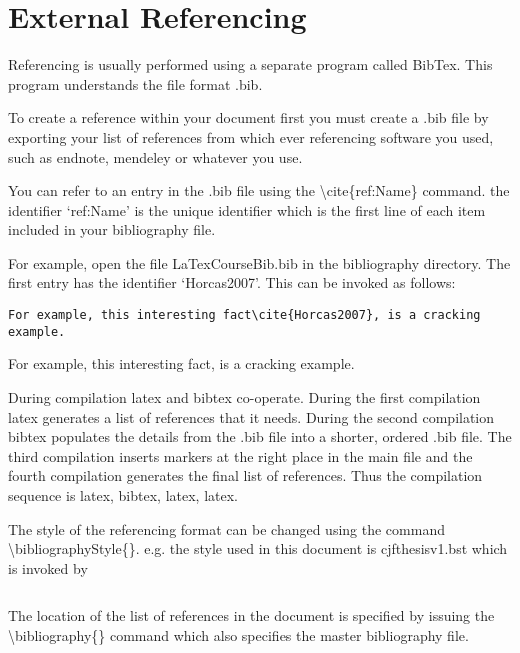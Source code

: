 \chapter{External Referencing}

Referencing is usually performed using a separate program called BibTex.  This program understands the file format .bib.

To create a reference within your document first you must create a .bib file by exporting your list of references from which ever referencing software you used, such as endnote, mendeley or whatever you use.

You can refer to an entry in the .bib file using the {\textbackslash}cite\{ref:Name\} command. the identifier `ref:Name' is the unique identifier which is the first line of each item included in your bibliography file.

For example, open the file LaTexCourseBib.bib in the bibliography directory. The first entry has the identifier `Horcas2007'.  This can be invoked as follows:


\begin{verbatim}
For example, this interesting fact\cite{Horcas2007}, is a cracking example.
\end{verbatim}

For example, this interesting fact\cite{Horcas2007}, is a cracking example.

During compilation latex and bibtex co-operate. During the first compilation latex generates a list of references that it needs.  During the second compilation bibtex populates the details from the .bib file into a shorter, ordered .bib file. The third compilation inserts markers at the right place in the main file and the fourth compilation generates the final list of references. Thus the compilation sequence is latex, bibtex, latex, latex.

The style of the referencing format can be changed using the command {\textbackslash}bibliographyStyle\{\}. e.g. the style used in this document is cjfthesisv1.bst which is invoked by 

\begin{verbatim}

\end{verbatim}

The location of the list of references in the document is specified by issuing the {\textbackslash}bibliography\{\} command which also specifies the master bibliography file.

\begin{verbatim}

\end{verbatim}




